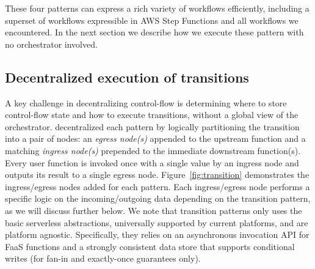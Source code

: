 These four patterns  can express a rich variety of workflows
efficiently, including a superset of workflows expressible in AWS Step
Functions and all workflows we encountered. In the next section we describe how we execute these pattern with no orchestrator involved.

\subsection{Decentralized execution of transitions}
\label{sec:transition-execution}

A key challenge in decentralizing control-flow is determining where to store
control-flow state and how to execute transitions, without a global view of the orchestrator. \name{} decentralized each pattern by logically partitioning the transition into a pair of nodes:  an \textit{egress node(s)} appended to the
upstream function and a matching \textit{ingress node(s)} prepended to the immediate
downstream function(s).  Every user function is invoked once with a
single value by an ingress node and outputs its result to a single egress
node.  Figure~\ref{fig:transition} demonstrates the ingress/egress nodes added for each pattern. Each ingress/egress node performs a specific logic on the incoming/outgoing data depending on the transition pattern,  as we will discuss further below.  We note that transition patterns only uses the basic serverless abstractions, universally supported by current platforms, and are platform agnostic.
Specifically, they relies
on an asynchronous invocation API for FaaS functions and a strongly consistent
data store that supports conditional writes (for fan-in and exactly-once guarantees only). 



